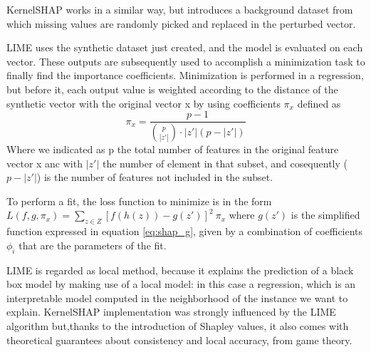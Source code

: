\documentclass[11pt]{report}
\begin{document}
KernelSHAP works in a similar way, but introduces a background dataset from which missing values are randomly picked and replaced in the perturbed vector.

LIME uses the synthetic dataset just created, and the model is evaluated on each vector.
These outputs are subsequently used to accomplish a minimization task to finally find the importance coefficients.
Minimization is performed in a regression, but before it, each output value is weighted according to the distance of the synthetic vector with the original vector x by using coefficients $\pi_x$ defined as
\begin{equation}
\pi_x = \frac{p-1}{{p \choose |z'|} \cdot |z'| (p-|z'|)}
\end{equation}
Where we indicated as p the total number of features in the original feature vector x anc with $|z'|$ the number of element in that subset, and cosequently ($p-|z'|$) is the number of features not included in the subset.

To perform a fit, the loss function to minimize is in the form $L(f, g, \pi_x) = \sum_{z\in Z} [f(h(z))-g(z')]^2\ \pi_x$
where $g(z')$ is the simplified function expressed in equation \ref{eq:shap_g}, given by a combination of coefficients $\phi_i$ that are the parameters of the fit.

LIME is regarded as local method, because it explains the prediction of a black box model by making use of a local model: in this case a regression, which is an interpretable model computed in the neighborhood of the instance we want to explain.
KernelSHAP implementation was strongly influenced by the LIME algorithm but,thanks to the introduction of Shapley values, it also comes with theoretical guarantees about consistency and local accuracy, from game theory.
\end{document}
